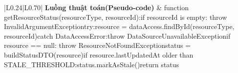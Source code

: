\begin{longtable}{|L{0.24\textwidth}|L{0.70\textwidth}|}
\textbf{Luồng thuật toán}\newline \textbf{(Pseudo-code)} & function getResourceStatus(resourceType, resourceId):\newline if resourceId is empty: throw InvalidArgumentException\newline try:\newline resource = dataAccess.findById(resourceType, resourceId)\newline catch DataAccessError:\newline throw DataSourceUnavailableException\newline if resource == null: throw ResourceNotFoundException\newline status = buildStatusDTO(resource)\newline if resource.lastUpdatedAt older than STALE\_THRESHOLD:\newline status.markAsStale()\newline return status \\
\hline
\end{longtable}
\vspace{-0.5\baselineskip}
